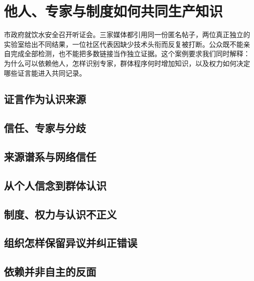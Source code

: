 \chapter{他人、专家与制度如何共同生产知识}

\begin{openingcase}
市政府就饮水安全召开听证会。三家媒体都引用同一份匿名帖子，两位真正独立的实验室给出不同结果，一位社区代表因缺少技术头衔而反复被打断。公众既不能亲自完成全部检测，也不能把多数链接当作独立证据。这个案例要求我们同时解释：为什么可以依赖他人，怎样识别专家，群体程序何时增加知识，以及权力如何决定哪些证言能进入共同记录。
\end{openingcase}

\section{证言作为认识来源}


\section{信任、专家与分歧}


\section{来源谱系与网络信任}



\section{从个人信念到群体认识}


\section{制度、权力与认识不正义}


\section{组织怎样保留异议并纠正错误}



\section{依赖并非自主的反面}


